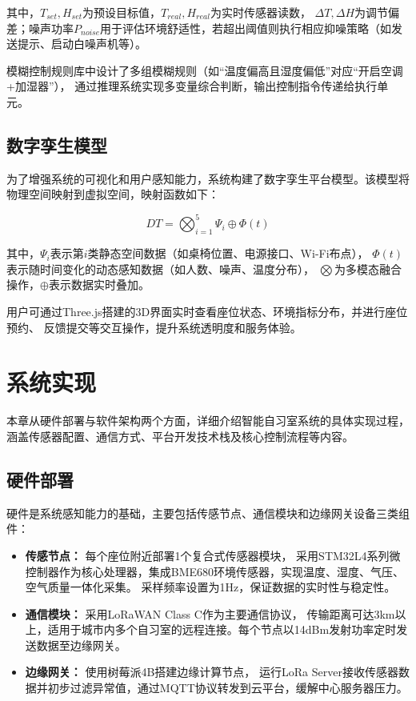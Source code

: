 \documentclass[12pt,a4paper]{IEEEtran} %
\begin{document}
其中，$T_{set}, H_{set}$为预设目标值，$T_{real}, H_{real}$为实时传感器读数，
$\Delta T, \Delta H$为调节偏差；噪声功率$P_{noise}$用于评估环境舒适性，若超出阈值则执行相应抑噪策略（如发送提示、启动白噪声机等）。

模糊控制规则库中设计了多组模糊规则（如“温度偏高且湿度偏低”对应“开启空调+加湿器”），
通过推理系统实现多变量综合判断，输出控制指令传递给执行单元。

\subsection{数字孪生模型}
为了增强系统的可视化和用户感知能力，系统构建了数字孪生平台模型。该模型将物理空间映射到虚拟空间，映射函数如下：

\begin{equation}
  DT = \bigotimes_{i=1}^5 \Psi_i \oplus \Phi(t)
\end{equation}

其中，$\Psi_i$表示第$i$类静态空间数据（如桌椅位置、电源接口、Wi-Fi布点），
$\Phi(t)$表示随时间变化的动态感知数据（如人数、噪声、温度分布），
$\bigotimes$为多模态融合操作，$\oplus$表示数据实时叠加。

用户可通过Three.js搭建的3D界面实时查看座位状态、环境指标分布，并进行座位预约、
反馈提交等交互操作，提升系统透明度和服务体验。

\section{系统实现}
本章从硬件部署与软件架构两个方面，详细介绍智能自习室系统的具体实现过程，
涵盖传感器配置、通信方式、平台开发技术栈及核心控制流程等内容。

\subsection{硬件部署}
硬件是系统感知能力的基础，主要包括传感节点、通信模块和边缘网关设备三类组件：

\begin{itemize}
  \item \textbf{传感节点：} 每个座位附近部署1个复合式传感器模块，
        采用STM32L4系列微控制器作为核心处理器，集成BME680环境传感器，实现温度、湿度、气压、空气质量一体化采集。
        采样频率设置为1Hz，保证数据的实时性与稳定性。

  \item \textbf{通信模块：} 采用LoRaWAN Class C作为主要通信协议，
        传输距离可达3km以上，适用于城市内多个自习室的远程连接。每个节点以14dBm发射功率定时发送数据至边缘网关。

  \item \textbf{边缘网关：} 使用树莓派4B搭建边缘计算节点，
        运行LoRa Server接收传感器数据并初步过滤异常值，通过MQTT协议转发到云平台，缓解中心服务器压力。
\end{itemize}
\end{document}
